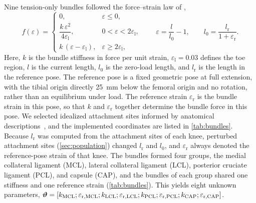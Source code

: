 

Nine tension-only bundles followed the force--strain law of \textcite{blankevoort1991ligament},
\begin{equation}
f(\varepsilon) =
\begin{cases}
0, & \varepsilon \le 0,\\[2pt]
\dfrac{k\,\varepsilon^2}{4\varepsilon_\mathrm{l}}, & 0 < \varepsilon < 2\varepsilon_\mathrm{l},\\[6pt]
k\,(\varepsilon - \varepsilon_\mathrm{l}), & \varepsilon \ge 2\varepsilon_\mathrm{l},
\end{cases}
\qquad
\varepsilon = \frac{l}{l_0} - 1,
\qquad
l_0 = \frac{l_\mathrm{r}}{1 + \varepsilon_\mathrm{r}}.
\label{eq:ligament}
\end{equation}
Here, $k$ is the bundle stiffness in force per unit strain, $\varepsilon_\mathrm{l} = 0.03$ defines the toe region, $l$ is the current length, $l_0$ is the zero-load length, and $l_\mathrm{r}$ is the length in the reference pose.
The reference pose is a fixed geometric pose at full extension, with the tibial origin directly \SI{25}{\milli\meter} below the femoral origin and no rotation, rather than an equilibrium under load.
The reference strain $\varepsilon_\mathrm{r}$ is the bundle strain in this pose, so that $k$ and $\varepsilon_\mathrm{r}$ together determine the bundle force in this pose.
We selected idealized attachment sites informed by anatomical descriptions~\autocite{laprade2007anatomy,laprade2003posterolateral,claes2013anatomy,amis2006anatomy}, and the implemented coordinates are listed in \autoref{tab:bundles}.
Because $l_\mathrm{r}$ was computed from the attachment sites of each knee, perturbed attachment sites (\autoref{sec:population}) changed $l_\mathrm{r}$ and $l_0$, and $\varepsilon_\mathrm{r}$ always denoted the reference-pose strain of that knee.
The bundles formed four groups, the medial collateral ligament (MCL), lateral collateral ligament (LCL), posterior cruciate ligament (PCL), and capsule (CAP), and the bundles of each group shared one stiffness and one reference strain (\autoref{tab:bundles}).
This yields eight unknown parameters, $\mbox{\boldmath $\vartheta$}{} = [k_\mathrm{MCL}; \varepsilon_{\mathrm{r},\mathrm{MCL}}; k_\mathrm{LCL}; \varepsilon_{\mathrm{r},\mathrm{LCL}}; k_\mathrm{PCL}; \varepsilon_{\mathrm{r},\mathrm{PCL}}; k_\mathrm{CAP}; \varepsilon_{\mathrm{r},\mathrm{CAP}}]$.



